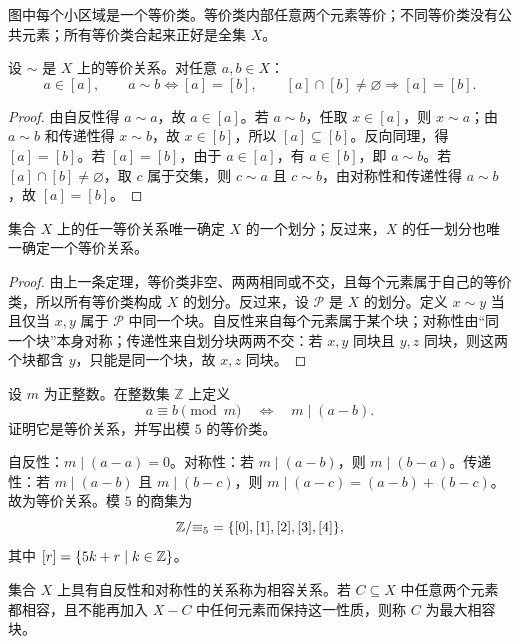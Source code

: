图中每个小区域是一个等价类。等价类内部任意两个元素等价；不同等价类没有公共元素；所有等价类合起来正好是全集 $X$。

\begin{theorem}[等价类的基本性质]\label{ch2-equivalence-class-laws}
设 $\sim$ 是 $X$ 上的等价关系。对任意 $a,b\in X$：
\[
  a\in[a],\qquad
  a\sim b\Longleftrightarrow [a]=[b],\qquad
  [a]\cap[b]\ne\varnothing\Longrightarrow [a]=[b].
\]
\end{theorem}

\begin{proof}
由自反性得 $a\sim a$，故 $a\in[a]$。若 $a\sim b$，任取 $x\in[a]$，则 $x\sim a$；由 $a\sim b$ 和传递性得 $x\sim b$，故 $x\in[b]$，所以 $[a]\subseteq[b]$。反向同理，得 $[a]=[b]$。若 $[a]=[b]$，由于 $a\in[a]$，有 $a\in[b]$，即 $a\sim b$。若 $[a]\cap[b]\ne\varnothing$，取 $c$ 属于交集，则 $c\sim a$ 且 $c\sim b$，由对称性和传递性得 $a\sim b$，故 $[a]=[b]$。
\end{proof}

\begin{theorem}[等价关系与划分的对应]\label{ch2-equivalence-partition-theorem}
集合 $X$ 上的任一等价关系唯一确定 $X$ 的一个划分；反过来，$X$ 的任一划分也唯一确定一个等价关系。
\end{theorem}

\begin{proof}
由上一条定理，等价类非空、两两相同或不交，且每个元素属于自己的等价类，所以所有等价类构成 $X$ 的划分。反过来，设 $\mathcal P$ 是 $X$ 的划分。定义 $x\sim y$ 当且仅当 $x,y$ 属于 $\mathcal P$ 中同一个块。自反性来自每个元素属于某个块；对称性由“同一个块”本身对称；传递性来自划分块两两不交：若 $x,y$ 同块且 $y,z$ 同块，则这两个块都含 $y$，只能是同一个块，故 $x,z$ 同块。
\end{proof}

\begin{example}[title={模同余关系}]\label{ch2-congruence}
设 $m$ 为正整数。在整数集 $\mathbb Z$ 上定义
\[
  a\equiv b\pmod m \quad\Longleftrightarrow\quad m\mid(a-b).
\]
证明它是等价关系，并写出模 $5$ 的等价类。
\begin{solution}
自反性：$m\mid(a-a)=0$。对称性：若 $m\mid(a-b)$，则 $m\mid(b-a)$。传递性：若 $m\mid(a-b)$ 且 $m\mid(b-c)$，则 $m\mid(a-c)=(a-b)+(b-c)$。故为等价关系。模 $5$ 的商集为
\[
\mathbb Z/{\equiv_5}=\{[0],[1],[2],[3],[4]\},
\]
其中 $[r]=\{5k+r\mid k\in\mathbb Z\}$。
\end{solution}
\end{example}

\begin{definition}[相容关系与最大相容块]\label{ch2-compatibility}
集合 $X$ 上具有自反性和对称性的关系称为相容关系。若 $C\subseteq X$ 中任意两个元素都相容，且不能再加入 $X-C$ 中任何元素而保持这一性质，则称 $C$ 为最大相容块。
\end{definition}

